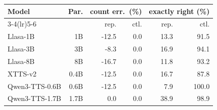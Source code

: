 \begin{tabular}{lrrrrr}
\toprule
Model & Par. & \multicolumn{2}{c}{count err.\ (\%)} & \multicolumn{2}{c}{exactly right (\%)} \\
\cmidrule(lr){3-4}\cmidrule(lr){5-6}
 & & rep. & ctl. & rep. & ctl. \\
\midrule
Llasa-1B & 1B & -12.5 & 0.0 & 13.3 & 91.5 \\
Llasa-3B & 3B & -8.3 & 0.0 & 16.9 & 94.1 \\
Llasa-8B & 8B & -16.7 & 0.0 & 11.8 & 93.2 \\
XTTS-v2 & 0.4B & -12.5 & 0.0 & 16.7 & 87.8 \\
Qwen3-TTS-0.6B & 0.6B & -12.5 & 0.0 & 7.9 & 100.0 \\
Qwen3-TTS-1.7B & 1.7B & 0.0 & 0.0 & 38.9 & 98.9 \\
\bottomrule
\end{tabular}
